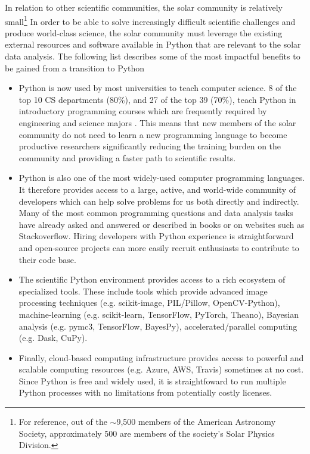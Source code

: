 In relation to other scientific communities, the solar community is relatively small\footnote{For reference, out of the $\sim$9,500 members of the American Astronomy Society, approximately 500 are members of the society's Solar Physics Division.}
In order to be able to solve increasingly difficult scientific challenges and produce world-class science, the solar community must leverage the existing external resources and software available in Python that are relevant to the solar data analysis.
The following list describes some of the most impactful benefits to be gained from a transition to Python

\begin{itemize}
  \item Python is now used by most universities to teach computer science. 8 of the top 10 CS departments (80\%), and 27 of the top 39 (70\%), teach Python in introductory programming courses which are frequently required by engineering and science majors \citep{guo2014}. This means that new members of the solar community do not need to learn a new programming language to become productive researchers significantly reducing the training burden on the community and providing a faster path to scientific results.
  \item Python is also one of the most widely-used computer programming languages. It therefore provides access to a large, active, and world-wide community of developers which can help solve problems for us both directly and indirectly. Many of the most common programming questions and data analysis tasks have already asked and answered or described in books or on websites such as Stackoverflow. Hiring developers with Python experience is straightforward and open-source projects can more easily recruit enthusiasts to contribute to their code base.
  \item The scientific Python environment provides access to a rich ecosystem of specialized tools. These include tools which provide advanced image processing techniques (e.g. scikit-image, PIL/Pillow, OpenCV-Python), machine-learning (e.g. scikit-learn, TensorFlow, PyTorch, Theano), Bayesian analysis (e.g. pymc3, TensorFlow, BayesPy), accelerated/parallel computing (e.g. Dask, CuPy).
  \item Finally, cloud-based computing infrastructure provides access to powerful and scalable computing resources (e.g. Azure, AWS, Travis) sometimes at no cost. Since Python is free and widely used, it is straightfoward to run multiple Python processes with no limitations from potentially costly licenses.
\end{itemize}

